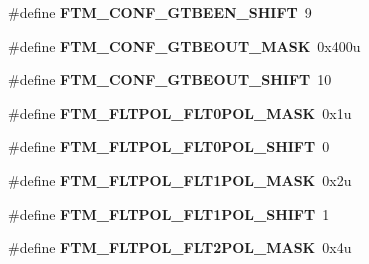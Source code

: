 \begin{DoxyCompactItemize}
\item 
\hypertarget{group___f_t_m___register___masks_ga08e28bc089eeea68a240bb8e716172d8}{}\#define {\bfseries F\+T\+M\+\_\+\+C\+O\+N\+F\+\_\+\+G\+T\+B\+E\+E\+N\+\_\+\+S\+H\+I\+F\+T}~9\label{group___f_t_m___register___masks_ga08e28bc089eeea68a240bb8e716172d8}

\item 
\hypertarget{group___f_t_m___register___masks_ga172965c1d295c0edcc7454a96bc03430}{}\#define {\bfseries F\+T\+M\+\_\+\+C\+O\+N\+F\+\_\+\+G\+T\+B\+E\+O\+U\+T\+\_\+\+M\+A\+S\+K}~0x400u\label{group___f_t_m___register___masks_ga172965c1d295c0edcc7454a96bc03430}

\item 
\hypertarget{group___f_t_m___register___masks_gab3cdb8493cf40ad27cd27b513fc618ec}{}\#define {\bfseries F\+T\+M\+\_\+\+C\+O\+N\+F\+\_\+\+G\+T\+B\+E\+O\+U\+T\+\_\+\+S\+H\+I\+F\+T}~10\label{group___f_t_m___register___masks_gab3cdb8493cf40ad27cd27b513fc618ec}

\item 
\hypertarget{group___f_t_m___register___masks_gac9a93adce89d23693d4895ea49c95fb0}{}\#define {\bfseries F\+T\+M\+\_\+\+F\+L\+T\+P\+O\+L\+\_\+\+F\+L\+T0\+P\+O\+L\+\_\+\+M\+A\+S\+K}~0x1u\label{group___f_t_m___register___masks_gac9a93adce89d23693d4895ea49c95fb0}

\item 
\hypertarget{group___f_t_m___register___masks_gaced2a4f6b0cfb4d3f76b81ed36f56188}{}\#define {\bfseries F\+T\+M\+\_\+\+F\+L\+T\+P\+O\+L\+\_\+\+F\+L\+T0\+P\+O\+L\+\_\+\+S\+H\+I\+F\+T}~0\label{group___f_t_m___register___masks_gaced2a4f6b0cfb4d3f76b81ed36f56188}

\item 
\hypertarget{group___f_t_m___register___masks_gaa7b2fdfe55a6efb22cd8df8b071cac7c}{}\#define {\bfseries F\+T\+M\+\_\+\+F\+L\+T\+P\+O\+L\+\_\+\+F\+L\+T1\+P\+O\+L\+\_\+\+M\+A\+S\+K}~0x2u\label{group___f_t_m___register___masks_gaa7b2fdfe55a6efb22cd8df8b071cac7c}

\item 
\hypertarget{group___f_t_m___register___masks_ga9b9e4e91e33926535a3b8f981f3058d6}{}\#define {\bfseries F\+T\+M\+\_\+\+F\+L\+T\+P\+O\+L\+\_\+\+F\+L\+T1\+P\+O\+L\+\_\+\+S\+H\+I\+F\+T}~1\label{group___f_t_m___register___masks_ga9b9e4e91e33926535a3b8f981f3058d6}

\item 
\hypertarget{group___f_t_m___register___masks_ga0810edda6aa6e4a53808b33db2049072}{}\#define {\bfseries F\+T\+M\+\_\+\+F\+L\+T\+P\+O\+L\+\_\+\+F\+L\+T2\+P\+O\+L\+\_\+\+M\+A\+S\+K}~0x4u\label{group___f_t_m___register___masks_ga0810edda6aa6e4a53808b33db2049072}


\end{DoxyCompactItemize}

